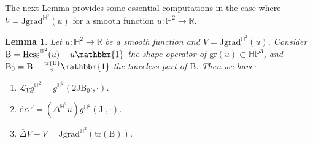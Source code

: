 \documentclass[JEP,XML,SOM,Unicode,NoEqCountersInSection, NoFloatCountersInSection,published]{cedram}
\theoremstyle{plain}
\newtheorem{lemma}[cor]{Lemma}
\theoremstyle{definition}
\newcommand{\HP}{\mathbb{HP}^3}
\newcommand{\grad}{\mathrm{grad}^{\mathbb{H}^2}}
\newcommand{\hess}{\mathrm{Hess}^{\mathbb{H}^2}}
\newcommand{\J}{\mathrm{J}}
\newcommand{\B}{\mathrm{B}}
\begin{document}
The next Lemma provides some essential computations in the case where \(V = \J \grad(u) \) for a smooth function \(u : \mathbb{H}^2 \to \mathbb{R} \).
\begin{lemma}\label{Lie_derivative_of_Ju}
Let $u:\mathbb{H}^2\to\mathbb{R}$ be a smooth function and $V=\J\grad(u)$. Consider $\B=\hess(u)-u\mathbbm{1}$ the shape operator of $\mathrm{gr}(u)\subset\HP$, and $\B_0=\B-\frac{\mathrm{tr}(\B)}{2}\mathbbm{1}$ the traceless part of $\B$. Then we have:
\begin{enumerate}
\item \label{1Lie_derivative_of_Ju} $\mathcal{L}_Vg^{\mathbb{H}^2}=g^{\mathbb{H}^2}(2\J\B_0\cdot,\cdot)$.
\item \label{2Lie_derivative_of_Ju} $\mathrm{d}\alpha^V=(\Delta^{\mathbb{H}^2} u) g^{\mathbb{H}^2}(\J\cdot,\cdot)$.
\item \label{3Lie_derivative_of_Ju} $
\overline{\Delta}V-V=\J\grad\left(\mathrm{tr}(\B) \right)$.
\end{enumerate}
\end{lemma}
\end{document}

